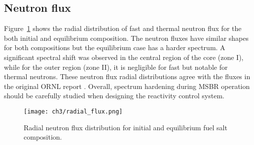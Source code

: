 \subsection{Neutron flux}
Figure~\ref{fig:radial_flux} shows the radial distribution of fast and thermal 
neutron flux for the both initial and equilibrium composition. The neutron 
fluxes have similar shapes for both compositions but the equilibrium case has a 
harder spectrum. A significant spectral shift was observed in the central 
region of the core (zone I), while for the outer region (zone II), it is 
negligible for fast but notable for thermal neutrons. These neutron flux radial 
distributions agree with the fluxes in the original ORNL report 
\cite{robertson_conceptual_1971}. 
Overall, spectrum hardening during \gls{MSBR} operation should be carefully 
studied when designing the reactivity control system.
\begin{figure}[ht!] %
	\texttt{[image: ch3/radial\_flux.png]}
	\caption{Radial neutron flux distribution for initial and equilibrium fuel 
	salt composition.}
	\label{fig:radial_flux}
\end{figure}

